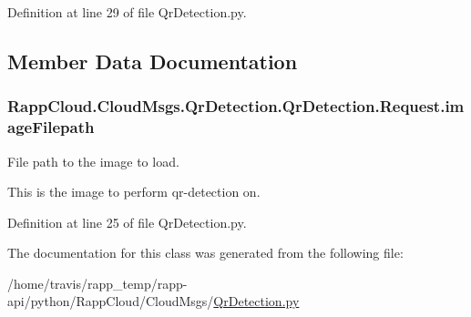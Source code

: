 Definition at line 29 of file Qr\-Detection.\-py.



\subsection{Member Data Documentation}
\hypertarget{classRappCloud_1_1CloudMsgs_1_1QrDetection_1_1QrDetection_1_1Request_a6ebdfcb42c3957142127566596c527bb}{
\subsubsection[{image\-Filepath}]{\setlength{\rightskip}{0pt plus 5cm}Rapp\-Cloud.\-Cloud\-Msgs.\-Qr\-Detection.\-Qr\-Detection.\-Request.\-image\-Filepath}}\label{classRappCloud_1_1CloudMsgs_1_1QrDetection_1_1QrDetection_1_1Request_a6ebdfcb42c3957142127566596c527bb}


File path to the image to load. 

This is the image to perform qr-\/detection on. 

Definition at line 25 of file Qr\-Detection.\-py.



The documentation for this class was generated from the following file\-:\begin{DoxyCompactItemize}
\item 
/home/travis/rapp\-\_\-temp/rapp-\/api/python/\-Rapp\-Cloud/\-Cloud\-Msgs/\hyperlink{QrDetection_8py}{Qr\-Detection.\-py}\end{DoxyCompactItemize}

